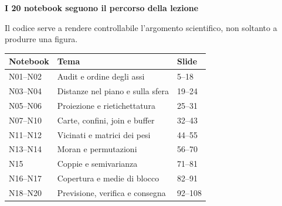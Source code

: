 \documentclass[12pt,aspectratio=1610]{beamer}
\begin{document}
\begin{frame}[plain]\hypertarget{slide109}{}
\begin{lrbox}{\TitleBox}
\begin{minipage}[t]{17.7cm}\raggedright\color{Ink}\fontsize{11.3}{14.8}\selectfont
\color{Navy}\bfseries\fontsize{20.6}{24.5}\selectfont I 20 notebook seguono il percorso della lezione
\end{minipage}\end{lrbox}

\begin{lrbox}{\RecallBox}
\begin{minipage}[t]{14.3cm}\raggedright\color{Ink}\fontsize{11.3}{14.8}\selectfont
\fontsize{10.3}{13.8}\selectfont Il codice serve a rendere controllabile l’argomento scientifico, non soltanto a produrre una figura.
\end{minipage}\end{lrbox}

\begin{lrbox}{\PilotLeftBox}
\begin{minipage}[t]{10.05cm}\raggedright\color{Ink}\fontsize{11.3}{14.8}\selectfont
{\fontsize{10.2}{13.1}\selectfont\renewcommand{\arraystretch}{1.45}\begin{tabular}{@{}p{2.1cm}p{5.05cm}p{1.6cm}@{}}\toprule
\textbf{Notebook} & \textbf{Tema} & \textbf{Slide}\\\midrule
N01--N02 & Audit e ordine degli assi & 5--18\\
N03--N04 & Distanze nel piano e sulla sfera & 19--24\\
N05--N06 & Proiezione e rietichettatura & 25--31\\
N07--N10 & Carte, confini, join e buffer & 32--43\\
N11--N12 & Vicinati e matrici dei pesi & 44--55\\
N13--N14 & Moran e permutazioni & 56--70\\
N15 & Coppie e semivarianza & 71--81\\
N16--N17 & Copertura e medie di blocco & 82--91\\
N18--N20 & Previsione, verifica e consegna & 92--108\\
\bottomrule\end{tabular}}

\end{minipage}\end{lrbox}


\end{frame}
\end{document}
